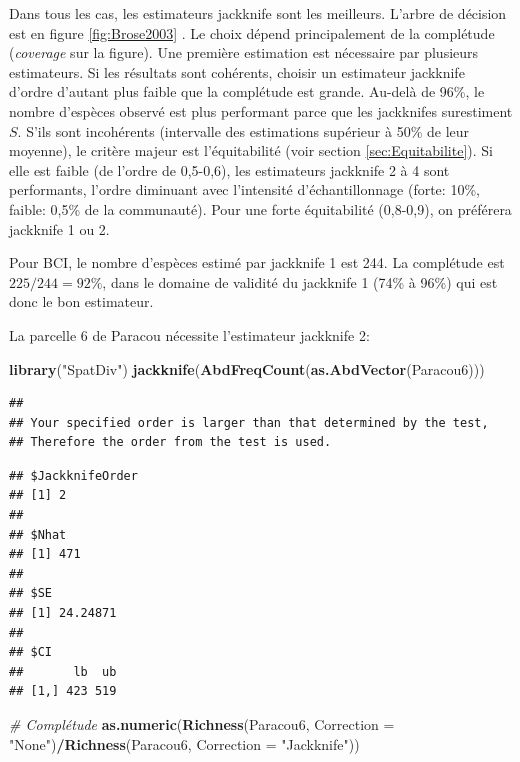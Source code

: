 \documentclass[
  11pt,
  french,
  a4paper,
  extrafontsizes,onecolumn,openright
  ]{memoir}
\newenvironment{Shaded}{\begin{snugshade}}{\end{snugshade}}
\newcommand{\CommentTok}[1]{\textcolor[rgb]{0.56,0.35,0.01}{\textit{#1}}}
\newcommand{\DataTypeTok}[1]{\textcolor[rgb]{0.13,0.29,0.53}{#1}}
\newcommand{\KeywordTok}[1]{\textcolor[rgb]{0.13,0.29,0.53}{\textbf{#1}}}
\newcommand{\NormalTok}[1]{#1}
\newcommand{\OperatorTok}[1]{\textcolor[rgb]{0.81,0.36,0.00}{\textbf{#1}}}
\newcommand{\StringTok}[1]{\textcolor[rgb]{0.31,0.60,0.02}{#1}}
\newlength{\rf}
\begin{document}
\normalsize

Dans tous les cas, les estimateurs jackknife sont les meilleurs.
L'arbre de décision est en figure \ref{fig:Brose2003} \autocite[fig.~6]{Brose2003}.
Le choix dépend principalement de la complétude (\emph{coverage} sur la figure).
Une première estimation est nécessaire par plusieurs estimateurs.
Si les résultats sont cohérents, choisir un estimateur jackknife d'ordre d'autant plus faible que la complétude est grande.
Au-delà de 96\%, le nombre d'espèces observé est plus performant parce que les jackknifes surestiment \(S\).
S'ils sont incohérents (intervalle des estimations supérieur à 50\% de leur moyenne), le critère majeur est l'équitabilité (voir section \ref{sec:Equitabilite}).
Si elle est faible (de l'ordre de 0,5-0,6), les estimateurs jackknife 2 à 4 sont performants, l'ordre diminuant avec l'intensité d'échantillonnage (forte: 10\%, faible: 0,5\% de la communauté).
Pour une forte équitabilité (0,8-0,9), on préférera jackknife 1 ou 2.

Pour BCI, le nombre d'espèces estimé par jackknife 1 est 244.
La complétude est \({225}/{244}=92\%\), dans le domaine de validité du jackknife 1 (74\% à 96\%) qui est donc le bon estimateur.

La parcelle 6 de Paracou nécessite l'estimateur jackknife 2:

\scriptsize

\begin{Shaded}
\begin{Highlighting}[]
\KeywordTok{library}\NormalTok{(}\StringTok{"SpatDiv"}\NormalTok{)}
\KeywordTok{jackknife}\NormalTok{(}\KeywordTok{AbdFreqCount}\NormalTok{(}\KeywordTok{as.AbdVector}\NormalTok{(Paracou6)))}
\end{Highlighting}
\end{Shaded}

\begin{verbatim}
## 
## Your specified order is larger than that determined by the test, 
## Therefore the order from the test is used.
\end{verbatim}

\begin{verbatim}
## $JackknifeOrder
## [1] 2
## 
## $Nhat
## [1] 471
## 
## $SE
## [1] 24.24871
## 
## $CI
##       lb  ub
## [1,] 423 519
\end{verbatim}

\begin{Shaded}
\begin{Highlighting}[]
\CommentTok{# Complétude}
\KeywordTok{as.numeric}\NormalTok{(}\KeywordTok{Richness}\NormalTok{(Paracou6, }\DataTypeTok{Correction =} \StringTok{"None"}\NormalTok{)}\OperatorTok{/}\KeywordTok{Richness}\NormalTok{(Paracou6, }
    \DataTypeTok{Correction =} \StringTok{"Jackknife"}\NormalTok{))}
\end{Highlighting}
\end{Shaded}
\end{document}
